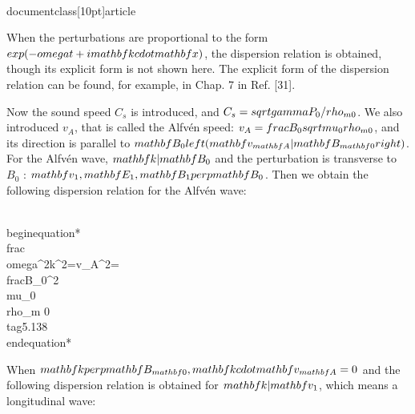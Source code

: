 \\documentclass[10pt]{article}
\begin{document}
{{{{When the perturbations are proportional to the form $\\exp (-\\omega t+i \\mathbf{k} \\cdot \\mathbf{x})$, the dispersion relation is obtained, though its explicit form is not shown here. The explicit form of the dispersion relation can be found, for example, in Chap. 7 in Ref. [31].

Now the sound speed $C_{s}$ is introduced, and $C_{s}=\\sqrt{\\gamma P_{0} / \\rho_{m 0}}$. We also introduced $v_{A}$, that is called the Alfvén speed: $v_{A}=\\frac{B_{0}}{\\sqrt{\\mu_{0} \\rho_{m 0}}}$, and its direction is parallel to $\\mathbf{B}_{0}\\left(\\mathbf{v}_{\\mathbf{A}} \\| \\mathbf{B}_{\\mathbf{0}}\\right)$. For the Alfvén wave, $\\mathbf{k} \\| \\mathbf{B}_{0}$ and the perturbation is transverse to $B_{0}$ : $\\mathbf{v}_{1}, \\mathbf{E}_{1}, \\mathbf{B}_{1} \\perp \\mathbf{B}_{0}$. Then we obtain the following dispersion relation for the Alfvén wave:


\\begin{equation*}
\\frac{\\omega^{2}}{k^{2}}=v_{A}^{2}=\\frac{B_{0}^{2}}{\\mu_{0} \\rho_{m 0}} \\tag{5.138}
\\end{equation*}


When $\\mathbf{k} \\perp \\mathbf{B}_{\\mathbf{0}}, \\mathbf{k} \\cdot \\mathbf{v}_{\\mathbf{A}}=0$ and the following dispersion relation is obtained for $\\mathbf{k} \\| \\mathbf{v}_{1}$, which means a longitudinal wave:


}}}}
\end{document}
